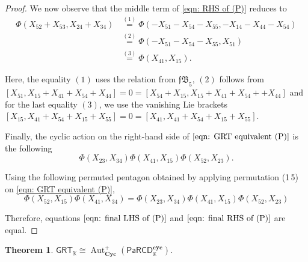 \documentclass{amsart}
\newcommand{\kk}{\mathbb{K}}    %
\newcommand{\PaRCD}{\mathsf{PaRCD}}
\newcommand{\hPaRCD}{{\PaRCD}_{\kk}}
\newcommand{\cyc}{\mathbf{cyc}}
\newcommand{\Cyc}{\mathbf{Cyc}}
\newcommand{\Aut}{\operatorname{Aut}}
\newcommand{\GRT}{{\mathsf{GRT}}}
\newtheorem{thm}[theorem]{Theorem}%
\theoremstyle{definition}
\numberwithin{equation}{section}
\begin{document}
\begin{proof}
We now observe that the middle term of \eqref{eqn: RHS of (P)} reduces to 
\begin{align*}
  \Phi(X_{52}+X_{53},X_{24}+X_{34}) &\overset{(1)}{=} \Phi(-X_{51} - X_{54} - X_{55}, -X_{14} - X_{44} - X_{54}) \\ 
    &\overset{(2)}{=} \Phi(-X_{51} - X_{54} - X_{55}, X_{51}) \\ 
    &\overset{(3)}{=}  \Phi(X_{41}, X_{15}).  
\end{align*}

Here, the equality $(1)$ uses the relation from $\mathfrak{fB}_5$, $(2)$ follows from $[X_{51}, X_{15}+ X_{41} + X_{54} + X_{44}] = 0 = [X_{54} +X_{15}, X_{15}+ X_{41}+ X_{54} + + X_{44}]$ and for the last equality $(3)$, we use the vanishing Lie brackets $[X_{15}, X_{41}+X_{54}+X_{15} + X_{55}] = 0 =  [X_{41}, X_{41} + X_{54} + X_{15}+ X_{55}]$.

Finally, the cyclic action on the right-hand side of $\eqref{eqn: GRT equivalent (P)}$ is the following
\begin{equation}\label{eqn:  final RHS of (P)}
    \Phi(X_{23},X_{34})  \Phi(X_{41},X_{15})  \Phi(X_{52},X_{23}). 
\end{equation}

Using the following permuted pentagon obtained by applying permutation (1\,5) on \eqref{eqn: GRT equivalent (P)}, 
\begin{equation}
   \Phi(X_{52}, X_{15})  \Phi(X_{41},X_{34}) = \Phi(X_{23}, X_{34})  \Phi(X_{41}, X_{15})  \Phi(X_{52}, X_{23})  
\end{equation}

Therefore, equations $\eqref{eqn: final LHS of (P)}$ and $\eqref{eqn:  final RHS of (P)}$ are equal.
\end{proof}

\begin{thm}\label{thm: GRT is cyclic PaRCD}
    $\GRT_{\kk} \cong \Aut_{\Cyc}^{+}(\hPaRCD^{\cyc})$.
\end{thm}
\end{document}
